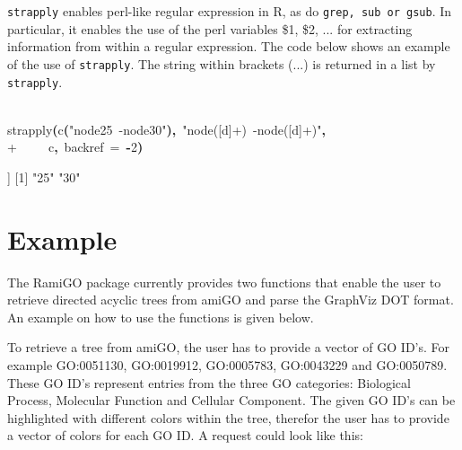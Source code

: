 \documentclass[a4paper,11pt]{article}
\newcommand{\hlnumber}[1]{\textcolor[rgb]{0.0823529411764706,0.0784313725490196,0.709803921568627}{#1}}%
\newcommand{\hlfunctioncall}[1]{\textcolor[rgb]{1,0,0}{#1}}%
\newcommand{\hlstring}[1]{\textcolor[rgb]{0.6,0.6,1}{#1}}%
\newcommand{\hlkeyword}[1]{\textcolor[rgb]{0,0,0}{\textbf{#1}}}%
\newcommand{\hlargument}[1]{\textcolor[rgb]{0.694117647058824,0.247058823529412,0.0196078431372549}{#1}}%
\newcommand{\hlsymbol}[1]{\textcolor[rgb]{0,0,0}{#1}}%
\newcommand{\hlprompt}[1]{\textcolor[rgb]{0,0,0}{#1}}%
\newcommand{\hlstd}[1]{\textcolor[rgb]{0,0,0}{#1}}%
\newenvironment{Houtput}{\raggedright}{%
%
}
\newcommand{\Rfunction}[1]{{\texttt{#1}}}
\begin{document}
\Rfunction{strapply} enables perl-like regular expression in R, as do \Rfunction{grep, sub or gsub}. In particular, it enables the use of the perl variables \$1, \$2, ... for extracting information from within a regular expression. The code below shows an example of the use of \Rfunction{strapply}. The string within brackets (...) is returned in a list by \Rfunction{strapply}.

\begin{Houtput}
\hspace*{\fill}\\
\hlstd{}\ttfamily\noindent
\hlprompt{\usebox{\hlnormalsizeboxgreaterthan}{\ }}\hlfunctioncall{strapply}\hlkeyword{(}\hlfunctioncall{c}\hlkeyword{(}\hlstring{"node25{\ }-\usebox{\hlnormalsizeboxgreaterthan}{\ }node30"}\hlkeyword{)}\hlkeyword{,}{\ }\hlstring{"node([\usebox{\hlnormalsizeboxbackslash}\usebox{\hlnormalsizeboxbackslash}d]+){\ }-\usebox{\hlnormalsizeboxgreaterthan}{\ }node([\usebox{\hlnormalsizeboxbackslash}\usebox{\hlnormalsizeboxbackslash}d]+)"}\hlkeyword{,}\hspace*{\fill}\\
\hlstd{}\hlprompt{+{\ }}{\ }{\ }{\ }{\ }\hlsymbol{c}\hlkeyword{,}{\ }\hlargument{backref}{\ }\hlargument{=}{\ }\hlkeyword{-}\hlnumber{2}\hlkeyword{)}\mbox{}
\normalfont
\hspace*{\fill}\\
\hlstd{}\begin{Schunk}
\begin{Soutput}
[[1]]
[1] "25" "30"
\end{Soutput}

\end{Schunk}
\end{Houtput}

\section{Example}
The RamiGO package currently provides two functions that enable the user to retrieve directed acyclic trees from amiGO and parse the GraphViz DOT format. An example on how to use the functions is given below.

To retrieve a tree from amiGO, the user has to provide a vector of GO ID's. For example GO:0051130, GO:0019912, GO:0005783, GO:0043229 and GO:0050789. These GO ID's represent entries from the three GO categories: Biological Process, Molecular Function and Cellular Component. The given GO ID's can be highlighted with different colors within the tree, therefor the user has to provide a vector of colors for each GO ID. A request could look like this:
\end{document}
